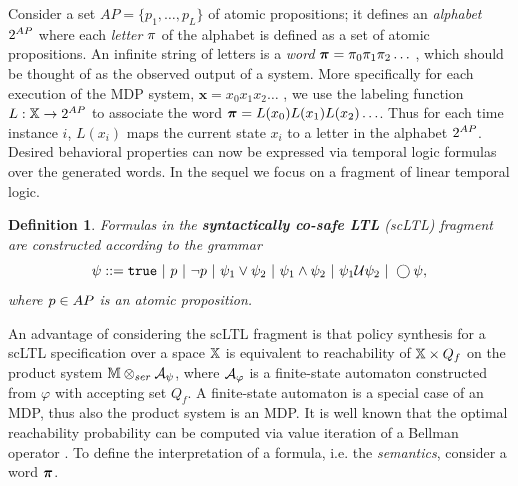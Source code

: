 \documentclass[draft,conference]{IEEEtran}
\newtheorem{definition}{Definition}
\newcommand{\red}[1]{{\color{red} #1 }}
\newcommand{\sofieNew}[1]{{\color{blue}#1}}
\begin{document}
Consider a set $AP = \{ p_1, \ldots, p_L \}$ of atomic propositions; it defines an \emph{alphabet} ${2^{AP}}$ where each \emph{letter} $\pi$ of the alphabet is defined as a set of atomic propositions. An infinite string of letters is a \emph{word} $\boldsymbol{\pi}=\pi_0\pi_1\pi_2\ldots$%
, which should be thought of as the observed output of a system. 
\sofieNew{More specifically for each execution of the MDP system,  $\mathbf{x} = x_0 x_1 x_2 \ldots$ , we use the }
labeling function $L: \mathbb{X} \rightarrow {2^{AP}}$ to 
associate the word $\boldsymbol{\pi} = L(x_0)L(x_1) L(x_2) \ldots$. Thus for each time instance $i$, $L(x_i)$ maps the current state $x_i$ to a letter in the alphabet ${2^{AP}}$.
\sofieNew{Desired behavioral properties can now be expressed via temporal logic formulas over the generated words.}
In the sequel we focus on a fragment of linear temporal logic. 
\begin{definition}
  \label{def:gdtl-syntax}
  Formulas in the \textbf{syntactically co-safe LTL} (scLTL) fragment are constructed according to the grammar
  \begin{equation*}
    \label{eq:scLTL}
    \psi ::=  \True \ |\ p \ |\ \lnot p \ |\ \psi_1 \vee\psi_2  \ |\ \psi_1 \land \psi_2 \ |\ \psi_1 \ltluntil \psi_2 \ |\ \ltlnext \psi,
  \end{equation*}
  where $p\in AP$ is an atomic proposition.
\end{definition}
An advantage of considering the scLTL fragment is that policy synthesis for a scLTL specification over a space $\mathbb{X}$ is equivalent to reachability of $\mathbb{X}\times Q_f$ on the product system $\mathbb{M} \otimes_{ser} \mathcal{A}_\psi$, where $\mathcal{A}_\varphi$ is a finite-state automaton constructed from $\varphi$ \cite{Belta2017} with accepting set $Q_f$. A finite-state automaton is a special case of an MDP, thus also the product system is an MDP. It is well known that the optimal reachability probability can be computed via value iteration of a Bellman operator \cite{Baier2008}. To define the interpretation of a formula, i.e. the \emph{semantics}, consider a word $\boldsymbol{\pi}$.
\end{document}
